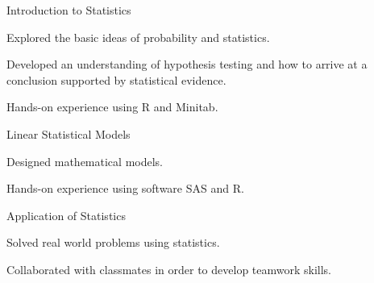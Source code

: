 

\begin{cventries}

  \cventry
    {Introduction to Statistics} %
    {} %
    {} %
    {} %
    {
    \begin{cvitems}
    \item Explored the basic ideas of probability and statistics.
    \item Developed an understanding of hypothesis testing and how to arrive at a conclusion supported by statistical evidence.
    \item Hands-on experience using R and Minitab.
    \end{cvitems}
    }

  \cventry
    {Linear Statistical Models} %
    {} %
    {} %
    {} %
    {
      \begin{cvitems}
      \item Designed mathematical models.
      \item Hands-on experience using software SAS and R.
      \end{cvitems}
    }

      \cventry
    {Application of Statistics} %
    {} %
    {} %
    {} %
    {
      \begin{cvitems}
      \item Solved real world problems using statistics.
        \item Collaborated with classmates in order to develop teamwork skills.
      \end{cvitems}
    }
\end{cventries}
